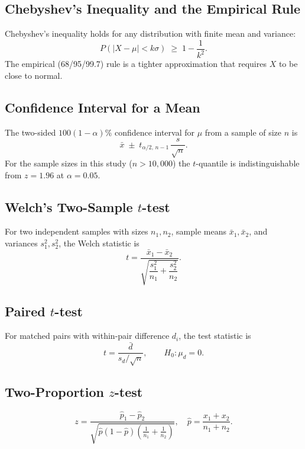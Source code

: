 \documentclass[conference,10pt]{IEEEtran}
\begin{document}
\subsection{Chebyshev's Inequality and the Empirical Rule}
Chebyshev's inequality holds for any distribution with finite mean and variance:
\begin{equation}
P(|X-\mu| < k\sigma) \;\ge\; 1 - \frac{1}{k^2}.
\label{eq:chebyshev}
\end{equation}
The empirical (68/95/99.7) rule is a tighter approximation that requires $X$ to be close to normal.

\subsection{Confidence Interval for a Mean}
The two\nobreakdash-sided $100(1-\alpha)\%$ confidence interval for $\mu$ from a sample of size $n$ is
\begin{equation}
\bar{x} \;\pm\; t_{\alpha/2,\,n-1}\,\frac{s}{\sqrt{n}}.
\label{eq:ci}
\end{equation}
For the sample sizes in this study ($n>10{,}000$) the $t$\nobreakdash-quantile is indistinguishable from $z=1.96$ at $\alpha=0.05$.

\subsection{Welch's Two-Sample $t$-test}
For two independent samples with sizes $n_1, n_2$, sample means $\bar{x}_1, \bar{x}_2$, and variances $s_1^2, s_2^2$, the Welch statistic is
\begin{equation}
t = \frac{\bar{x}_1 - \bar{x}_2}{\sqrt{\dfrac{s_1^2}{n_1}+\dfrac{s_2^2}{n_2}}}.
\label{eq:welch}
\end{equation}

\subsection{Paired $t$-test}
For matched pairs with within\nobreakdash-pair difference $d_i$, the test statistic is
\begin{equation}
t = \frac{\bar{d}}{s_d/\sqrt{n}}, \qquad H_0:\mu_d = 0.
\label{eq:paired}
\end{equation}

\subsection{Two-Proportion $z$-test}
\begin{equation}
z = \frac{\hat{p}_1 - \hat{p}_2}{\sqrt{\hat{p}(1-\hat{p})\!\left(\frac{1}{n_1}+\frac{1}{n_2}\right)}}, \quad \hat{p}=\frac{x_1+x_2}{n_1+n_2}.
\label{eq:zprop}
\end{equation}
\end{document}
